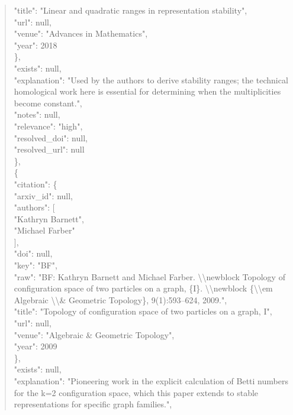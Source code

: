 \documentclass[11pt]{article}
\begin{document}
\begin{quote}
        "title": "Linear and quadratic ranges in representation stability",\\
        "url": null,\\
        "venue": "Advances in Mathematics",\\
        "year": 2018\\
      \},\\
      "exists": null,\\
      "explanation": "Used by the authors to derive stability ranges; the technical homological work here is essential for determining when the multiplicities become constant.",\\
      "notes": null,\\
      "relevance": "high",\\
      "resolved\_doi": null,\\
      "resolved\_url": null\\
    \},\\
    \{\\
      "citation": \{\\
        "arxiv\_id": null,\\
        "authors": [\\
          "Kathryn Barnett",\\
          "Michael Farber"\\
        ],\\
        "doi": null,\\
        "key": "BF",\\
        "raw": "BF: Kathryn Barnett and Michael Farber. \textbackslash{}\textbackslash{}newblock Topology of configuration space of two particles on a graph, \{I\}. \textbackslash{}\textbackslash{}newblock \{\textbackslash{}\textbackslash{}em Algebraic \textbackslash{}\textbackslash{}\& Geometric Topology\}, 9(1):593--624, 2009.",\\
        "title": "Topology of configuration space of two particles on a graph, I",\\
        "url": null,\\
        "venue": "Algebraic \& Geometric Topology",\\
        "year": 2009\\
      \},\\
      "exists": null,\\
      "explanation": "Pioneering work in the explicit calculation of Betti numbers for the k=2 configuration space, which this paper extends to stable representations for specific graph families.",\\

\end{quote}
\end{document}
